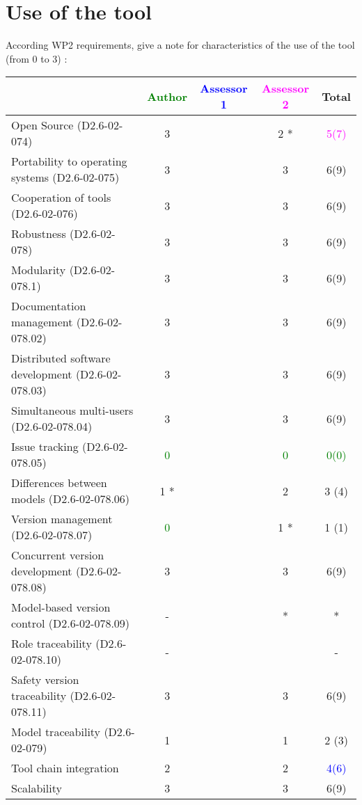 \section{Use of the tool}


According WP2 requirements, give a note for characteristics of the use of the tool (from 0 to 3) :

\begin{tabular}{|l | c | c | c | c|}
\hline
& \textcolor{green}{Author} & \textcolor{blue}{Assessor 1} & \textcolor{magenta}{Assessor 2} & Total \\
\hline 
Open Source (D2.6-02-074) & 3     & & 2    *& \textcolor{magenta}{5(7)}  \\
\hline 
Portability to operating systems (D2.6-02-075) & 3     & & 3     &  6(9) \\
\hline
Cooperation of tools (D2.6-02-076) & 3     & & 3     &  6(9) \\
\hline
Robustness (D2.6-02-078) & 3     & & 3     &  6(9) \\
\hline
Modularity (D2.6-02-078.1) & 3     & & 3     &  6(9) \\
\hline
Documentation management (D2.6-02-078.02) & 3     & & 3     &  6(9) \\
\hline
Distributed software development (D2.6-02-078.03)  & 3     & & 3     &  6(9) \\
\hline
Simultaneous multi-users (D2.6-02-078.04)   & 3     & & 3     &  6(9) \\
\hline
Issue tracking (D2.6-02-078.05) & \textcolor{green}{0} & & \textcolor{green}{0} & \textcolor{green}{0(0)}  \\
\hline
Differences between models (D2.6-02-078.06) & 1    * & & 2     & 3 (4) \\
\hline
Version management (D2.6-02-078.07) & \textcolor{green}{0} & & 1    * & 1 (1) \\
\hline
Concurrent version development (D2.6-02-078.08) & 3     & & 3     &  6(9) \\
\hline
Model-based version control (D2.6-02-078.09) & - & & * & * \\
\hline
Role traceability (D2.6-02-078.10) & - & & & - \\
\hline
Safety version traceability (D2.6-02-078.11) & 3     & & 3     &  6(9) \\
\hline
Model traceability (D2.6-02-079) & 1     & & 1     & 2 (3) \\
\hline
Tool chain integration & 2     & & 2     & \textcolor{blue}{4(6)}  \\
\hline
Scalability & 3     & & 3     &  6(9) \\
\hline
\end{tabular}

